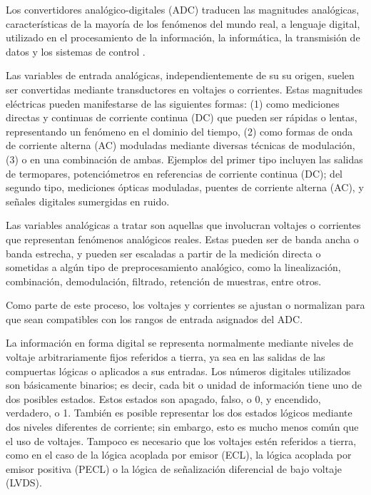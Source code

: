     Los convertidores analógico-digitales (ADC) traducen las magnitudes analógicas, características de la mayoría de los fenómenos del mundo real, a lenguaje digital, utilizado en el procesamiento de la información, la informática, la transmisión de datos y los sistemas de control \cite{Kester2007}.

    Las variables de entrada analógicas, independientemente de su su origen, suelen ser convertidas mediante transductores en voltajes o corrientes. Estas magnitudes eléctricas pueden manifestarse de las siguientes formas: (1) como mediciones directas y continuas de corriente continua (DC) que pueden ser rápidas o lentas, representando un fenómeno en el dominio del tiempo, (2) como formas de onda de corriente alterna (AC) moduladas mediante diversas técnicas de modulación, (3) o en una combinación de ambas. Ejemplos del primer tipo incluyen las salidas de termopares, potenciómetros en referencias de corriente continua (DC); del segundo tipo, mediciones ópticas moduladas, puentes de corriente alterna (AC), y señales digitales sumergidas en ruido.

    Las variables analógicas a tratar son aquellas que involucran voltajes o corrientes que representan fenómenos analógicos reales. Estas pueden ser de banda ancha o banda estrecha, y pueden ser escaladas a partir de la medición directa o sometidas a algún tipo de preprocesamiento analógico, como la linealización, combinación, demodulación, filtrado, retención de muestras, entre otros.

    Como parte de este proceso, los voltajes y corrientes se ajustan o normalizan para que sean compatibles con los rangos de entrada asignados del ADC.

    La información en forma digital se representa normalmente mediante niveles de voltaje arbitrariamente fijos referidos a tierra, ya sea en las salidas de las compuertas lógicas o aplicados a sus entradas. Los números digitales utilizados son básicamente binarios; es decir, cada bit o unidad de información tiene uno de dos posibles estados. Estos estados son apagado, falso, o 0, y encendido, verdadero, o 1. También es posible representar los dos estados lógicos mediante dos niveles diferentes de corriente; sin embargo, esto es mucho menos común que el uso de voltajes. Tampoco es necesario que los voltajes estén referidos a tierra, como en el caso de la lógica acoplada por emisor (ECL), la lógica acoplada por emisor positiva (PECL) o la lógica de señalización diferencial de bajo voltaje (LVDS).

